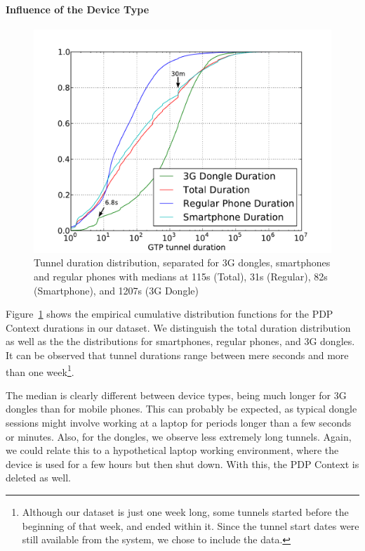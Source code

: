 \paragraph{Influence of the Device Type}

\begin{figure}[htb]
    \centering
    \includegraphics[width=\textwidth]{images/tunnel-dur-class-cdf-mod.pdf}
    \caption{Tunnel duration distribution, separated for 3G dongles, smartphones and regular phones with medians at 115s (Total), 31s (Regular), 82s (Smartphone), and 1207s (3G Dongle)}
    \label{c4:fig:cdf-duration-device-class}
\end{figure}

Figure~\ref{c4:fig:cdf-duration-device-class} shows the empirical cumulative distribution functions for the PDP Context durations in our dataset. We distinguish the total duration distribution as well as the the distributions for smartphones, regular phones, and 3G dongles. It can be observed that tunnel durations range between mere seconds and more than one week\footnote{Although our dataset is just one week long, some tunnels started before the beginning of that week, and ended within it. Since the tunnel start dates were still available from the system, we chose to include the data.}.

The median is clearly different between device types, being much longer for 3G dongles than for mobile phones. This can probably be expected, as typical dongle sessions might involve working at a laptop for periods longer than a few seconds or minutes. Also, for the dongles, we observe less extremely long tunnels. Again, we could relate this to a hypothetical laptop working environment, where the device is used for a few hours but then shut down. With this, the PDP Context is deleted as well. 

